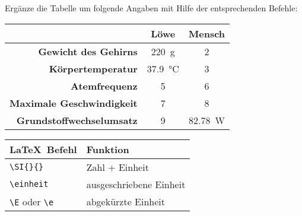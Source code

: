 \begin{frame}[fragile]
	\vspace{-0.3cm}
	\begin{Aufgabe}
	Ergänze die Tabelle um folgende Angaben mit Hilfe der entsprechenden Befehle:
	\end{Aufgabe}
	\begin{outputbox}
		\begin{center}
			\begin{tabular}{r|cc}
				\hline
				&	\textbf{Löwe}										& \textbf{Mensch} 						\\ \hline
				\textbf{Gewicht des Gehirns}		&	\SI{220}{\g}										& 2			\\ 
				\textbf{Körpertemperatur}			&	\SI{37.9}{\degreeCelsius}							& 3	\\
				\textbf{Atemfrequenz}				&	5								& 6 					\\
				\textbf{Maximale Geschwindigkeit}	&	7								& 8				\\ 
				\textbf{Grundstoffwechselumsatz}	& 9	&  \SI{82.78}{\watt}\\
				\hline
			\end{tabular}
		\end{center}
	\end{outputbox}
	
	\begin{center}
		\begin{tabular}{ll}
			\toprule
			\LaTeX\ Befehl						&	Funktion						\\ \midrule
			\lstinline|\SI{}{}|					&	Zahl + Einheit					\\
			\lstinline|\einheit|				&	ausgeschriebene Einheit			\\
			\lstinline|\E| oder \lstinline|\e|	&	abgekürzte Einheit				\\
			\bottomrule
		\end{tabular}
	\end{center}
	\vspace{0.1cm}
\end{frame}

